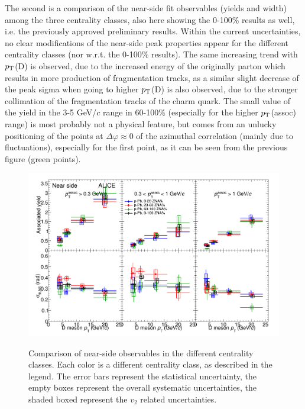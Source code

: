 The second is a comparison of the near-side fit observables (yields and width) among the three centrality classes, also here showing the 0-100\% results as well, i.e. the previously approved preliminary results. Within the current uncertainties, no clear modifications of the near-side peak properties appear for the different centrality classes (nor w.r.t. the 0-100\% results). The same increasing trend with $p_{\rm T}$(D) is observed, due to the increased energy of the originally parton which results in more production of fragmentation tracks, as a similar slight decrease of the peak sigma when going to higher $p_{\rm T}$(D) is also observed, due to the stronger collimation of the fragmentation tracks of the charm quark. The small value of the yield in the 3-5 GeV/$c$ range in 60-100\% (especially for the higher $p_{\rm T}$(assoc) range) is most probably not a physical feature, but comes from an unlucky positioning of the points at $\Delta\varphi \approx 0$ of the azimuthal correlation (mainly due to fluctuations), especially for the first point, as it can be seen from the previous figure (green points).

\begin{landscape}
\begin{figure}
\centering
{\includegraphics[width=0.95\linewidth]{figuresVsCent/Averages/Trends/ComparePPbVsCentFitResults.png}}
 \caption{Comparison of near-side observables in the different centrality classes. Each color is a different centrality class, as described in the legend. The error bars represent the statistical uncertainty, the empty boxes represent the overall systematic uncertainties, the shaded boxed represent the $v_2$ related uncertainties.}
\label{fig:prel2}
\end{figure}
\end{landscape}

